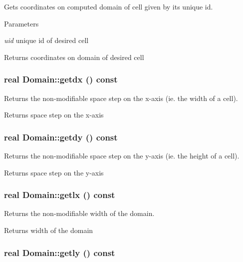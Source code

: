 Gets coordinates on computed domain of cell given by its unique id. 
\begin{DoxyParams}{Parameters}
\item[{\em uid}]unique id of desired cell\end{DoxyParams}
\begin{DoxyReturn}{Returns}
coordinates on domain of desired cell 
\end{DoxyReturn}
\hypertarget{classDomain_acdf83ef9d3dad3bbc1ae3101f4b2e323}{
\subsubsection[{getdx}]{\setlength{\rightskip}{0pt plus 5cm}real Domain::getdx () const}}
\label{classDomain_acdf83ef9d3dad3bbc1ae3101f4b2e323}


Returns the non-\/modifiable space step on the x-\/axis (ie. the width of a cell). \begin{DoxyReturn}{Returns}
space step on the x-\/axis 
\end{DoxyReturn}
\hypertarget{classDomain_a5d72188d7c1873c08da8ef387dee33c6}{
\subsubsection[{getdy}]{\setlength{\rightskip}{0pt plus 5cm}real Domain::getdy () const}}
\label{classDomain_a5d72188d7c1873c08da8ef387dee33c6}


Returns the non-\/modifiable space step on the y-\/axis (ie. the height of a cell). \begin{DoxyReturn}{Returns}
space step on the y-\/axis 
\end{DoxyReturn}
\hypertarget{classDomain_a04980b3ddcccb30a79f8fa3c9441d904}{
\subsubsection[{getlx}]{\setlength{\rightskip}{0pt plus 5cm}real Domain::getlx () const}}
\label{classDomain_a04980b3ddcccb30a79f8fa3c9441d904}


Returns the non-\/modifiable width of the domain. \begin{DoxyReturn}{Returns}
width of the domain 
\end{DoxyReturn}
\hypertarget{classDomain_a742a544929b9b82e0d654de8a85ab49b}{
\subsubsection[{getly}]{\setlength{\rightskip}{0pt plus 5cm}real Domain::getly () const}}
\label{classDomain_a742a544929b9b82e0d654de8a85ab49b}


